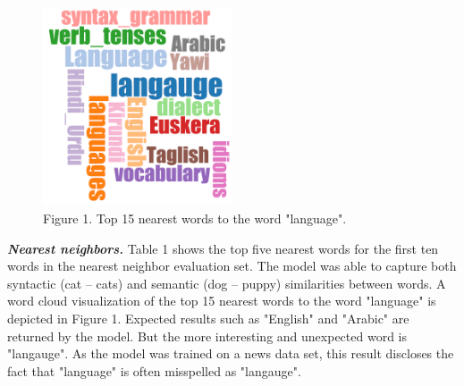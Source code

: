 \documentclass[12pt]{report}
\begin{document}
\begin{figure}
	\centering
	\includegraphics[trim=0.cm 0cm 0cm 0cm, clip=true,width=0.5\textwidth]{./Figures/language}
	\caption*{Figure 1. Top 15 nearest words to the word "language".}
	\label{fig:wordCloud}
\end{figure}	
	
\noindent\textbf{\emph{Nearest neighbors.}}  Table 1 shows the top five nearest words for the first ten words in the nearest neighbor evaluation set. The model was able to capture both syntactic (cat -- cats) and semantic (dog -- puppy) similarities between words. A word cloud visualization of the top 15 nearest words to the word "language" is depicted in Figure 1. Expected results such as "English" and "Arabic" are returned by the model. But the more interesting and unexpected word is "langauge". As the model was trained on a news data set, this result discloses the fact that "language" is often misspelled as "langauge". 
\end{document}
